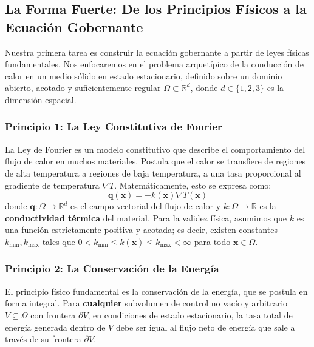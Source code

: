 \subsection{La Forma Fuerte: De los Principios Físicos a la Ecuación Gobernante}
Nuestra primera tarea es construir la ecuación gobernante a partir de leyes físicas fundamentales. Nos enfocaremos en el problema arquetípico de la conducción de calor en un medio sólido en estado estacionario, definido sobre un dominio abierto, acotado y suficientemente regular \(\Omega \subset \mathbb{R}^d\), donde \(d \in \{1, 2, 3\}\) es la dimensión espacial.

\subsubsection{Principio 1: La Ley Constitutiva de Fourier}
La Ley de Fourier es un modelo constitutivo que describe el comportamiento del flujo de calor en muchos materiales. Postula que el calor se transfiere de regiones de alta temperatura a regiones de baja temperatura, a una tasa proporcional al gradiente de temperatura \(\nabla T\). Matemáticamente, esto se expresa como:
\begin{equation}
    \bm{q}(\bm{x}) = -k(\bm{x}) \nabla T(\bm{x})
    \label{eq:fourier-law}
\end{equation}
donde \(\bm{q}: \Omega \to \mathbb{R}^d\) es el campo vectorial del flujo de calor y \(k: \Omega \to \mathbb{R}\) es la \textbf{conductividad térmica} del material. Para la validez física, asumimos que \(k\) es una función estrictamente positiva y acotada; es decir, existen constantes \(k_{\min}, k_{\max}\) tales que \(0 < k_{\min} \leq k(\bm{x}) \leq k_{\max} < \infty\) para todo \(\bm{x} \in \Omega\).

\subsubsection{Principio 2: La Conservación de la Energía}
El principio físico fundamental es la conservación de la energía, que se postula en forma integral. Para \textbf{cualquier} subvolumen de control no vacío y arbitrario \(V \subseteq \Omega\) con frontera \(\partial V\), en condiciones de estado estacionario, la tasa total de energía generada dentro de \(V\) debe ser igual al flujo neto de energía que sale a través de su frontera \(\partial V\).

